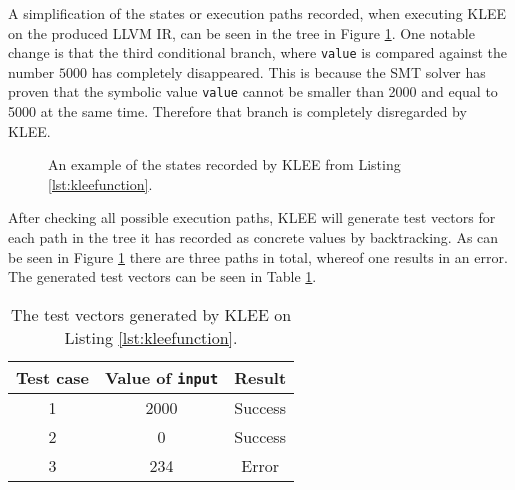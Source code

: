 A simplification of the states or execution paths recorded, when executing KLEE
on the produced LLVM IR, can be seen in the tree in Figure
\ref{figure:kleetree}.  One notable change is that the third conditional
branch, where \texttt{value} is compared against the number $5000$ has
completely disappeared. This is because the SMT solver has proven that the
symbolic value \texttt{value} cannot be smaller than 2000 and equal to 5000 at
the same time.  Therefore that branch is completely disregarded by KLEE.
\begin{figure}[h]
    \centering
    \caption{An example of the states recorded by KLEE from Listing \ref{lst:kleefunction}.}
    \label{figure:kleetree}
\end{figure}
After checking all possible execution paths, KLEE will generate test vectors
for each path in the tree it has recorded as concrete values by backtracking.
As can be seen in Figure \ref{figure:kleetree} there are three paths in total,
whereof one results in an error. The generated test vectors can be seen in Table
\ref{tab:kleeexample}.

\begin{table}[h]
    \centering
    \begin{tabular}{||c c c||}
        \hline
        Test case & Value of \texttt{input} & Result \\ [0.5ex]
        \hline\hline
        1 & 2000 & Success\\
        \hline
        2 & 0 & Success \\
        \hline
        3 & 234 & Error \\
        \hline
    \end{tabular}
    \caption{The test vectors generated by KLEE on Listing \ref{lst:kleefunction}.}
    \label{tab:kleeexample}
\end{table}

